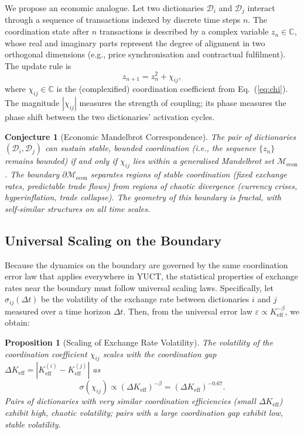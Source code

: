 \documentclass[12pt,a4paper]{article}
\newtheorem{proposition}[theorem]{Proposition}
\newtheorem{conjecture}[theorem]{Conjecture}
\theoremstyle{remark}
\begin{document}
	We propose an economic analogue. Let two dictionaries \(\mathcal{D}_i\) and \(\mathcal{D}_j\) interact through a sequence of transactions indexed by discrete time steps \(n\). The coordination state after \(n\) transactions is described by a complex variable \(z_n \in \mathbb{C}\), whose real and imaginary parts represent the degree of alignment in two orthogonal dimensions (e.g., price synchronisation and contractual fulfilment). The update rule is
	\begin{equation}
		z_{n+1} = z_n^2 + \chi_{ij},
		\label{eq:mandel_econ}
	\end{equation}
	where \(\chi_{ij} \in \mathbb{C}\) is the (complexified) coordination coefficient from Eq.~(\ref{eq:chi}). The magnitude \(|\chi_{ij}|\) measures the strength of coupling; its phase measures the phase shift between the two dictionaries' activation cycles.
	
	\begin{conjecture}[Economic Mandelbrot Correspondence]
		The pair of dictionaries \((\mathcal{D}_i, \mathcal{D}_j)\) can sustain stable, bounded coordination (i.e., the sequence \(\{z_n\}\) remains bounded) if and only if \(\chi_{ij}\) lies within a generalised Mandelbrot set \(\mathcal{M}_{\mathrm{econ}}\). The boundary \(\partial\mathcal{M}_{\mathrm{econ}}\) separates regions of stable coordination (fixed exchange rates, predictable trade flows) from regions of chaotic divergence (currency crises, hyperinflation, trade collapse). The geometry of this boundary is fractal, with self‑similar structures on all time scales.
	\end{conjecture}
	
	\subsection{Universal Scaling on the Boundary}
	
	Because the dynamics on the boundary are governed by the same coordination error law that applies everywhere in YUCT, the statistical properties of exchange rates near the boundary must follow universal scaling laws. Specifically, let \(\sigma_{ij}(\Delta t)\) be the volatility of the exchange rate between dictionaries \(i\) and \(j\) measured over a time horizon \(\Delta t\). Then, from the universal error law \(\varepsilon \propto K_{\mathrm{eff}}^{-\beta}\), we obtain:
	
	\begin{proposition}[Scaling of Exchange Rate Volatility]
		The volatility of the coordination coefficient \(\chi_{ij}\) scales with the coordination gap \(\Delta K_{\mathrm{eff}} = |K_{\mathrm{eff}}^{(i)} - K_{\mathrm{eff}}^{(j)}|\) as
		\begin{equation}
			\sigma(\chi_{ij}) \propto (\Delta K_{\mathrm{eff}})^{-\beta} = (\Delta K_{\mathrm{eff}})^{-0.67}.
			\label{eq:vol_scaling}
		\end{equation}
		Pairs of dictionaries with very similar coordination efficiencies (small \(\Delta K_{\mathrm{eff}}\)) exhibit high, chaotic volatility; pairs with a large coordination gap exhibit low, stable volatility.
	\end{proposition}
	
\end{document}
